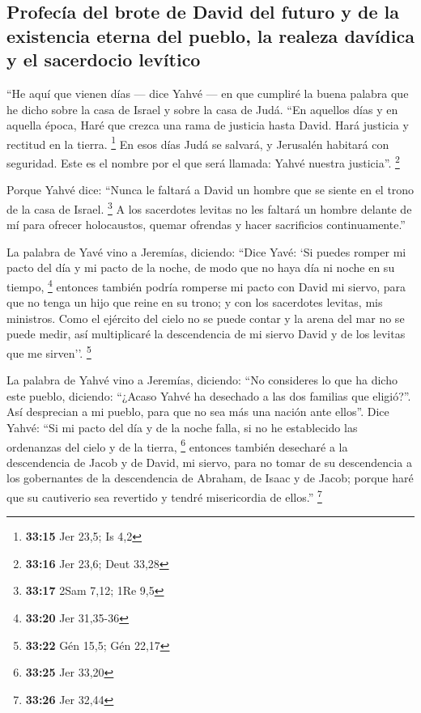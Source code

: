 \begin{paracol}{2}
\hypertarget{profecuxeda-del-brote-de-david-del-futuro-y-de-la-existencia-eterna-del-pueblo-la-realeza-davuxeddica-y-el-sacerdocio-levuxedtico}{%
\subsection{Profecía del brote de David del futuro y de la existencia
eterna del pueblo, la realeza davídica y el sacerdocio
levítico}\label{profecuxeda-del-brote-de-david-del-futuro-y-de-la-existencia-eterna-del-pueblo-la-realeza-davuxeddica-y-el-sacerdocio-levuxedtico}}

 ``He aquí que vienen días --- dice Yahvé --- en que
cumpliré la buena palabra que he dicho sobre la casa de Israel y sobre
la casa de Judá.  ``En aquellos días y en aquella época,
Haré que crezca una rama de justicia hasta David. Hará justicia y
rectitud en la tierra. \footnote{\textbf{33:15} Jer 23,5; Is 4,2}
 En esos días Judá se salvará, y Jerusalén habitará con
seguridad. Este es el nombre por el que será llamada: Yahvé nuestra
justicia''. \footnote{\textbf{33:16} Jer 23,6; Deut 33,28}

 Porque Yahvé dice: ``Nunca le faltará a David un hombre
que se siente en el trono de la casa de Israel. \footnote{\textbf{33:17}
  2Sam 7,12; 1Re 9,5}  A los sacerdotes levitas no les
faltará un hombre delante de mí para ofrecer holocaustos, quemar
ofrendas y hacer sacrificios continuamente.''

 La palabra de Yavé vino a Jeremías, diciendo:
 ``Dice Yavé: `Si puedes romper mi pacto del día y mi
pacto de la noche, de modo que no haya día ni noche en su tiempo,
\footnote{\textbf{33:20} Jer 31,35-36}  entonces también
podría romperse mi pacto con David mi siervo, para que no tenga un hijo
que reine en su trono; y con los sacerdotes levitas, mis ministros.
 Como el ejército del cielo no se puede contar y la arena
del mar no se puede medir, así multiplicaré la descendencia de mi siervo
David y de los levitas que me sirven''. \footnote{\textbf{33:22} Gén
  15,5; Gén 22,17}

 La palabra de Yahvé vino a Jeremías, diciendo:
 ``No consideres lo que ha dicho este pueblo, diciendo:
``¿Acaso Yahvé ha desechado a las dos familias que eligió?''. Así
desprecian a mi pueblo, para que no sea más una nación ante ellos''.
 Dice Yahvé: ``Si mi pacto del día y de la noche falla,
si no he establecido las ordenanzas del cielo y de la tierra,
\footnote{\textbf{33:25} Jer 33,20}  entonces también
desecharé a la descendencia de Jacob y de David, mi siervo, para no
tomar de su descendencia a los gobernantes de la descendencia de
Abraham, de Isaac y de Jacob; porque haré que su cautiverio sea
revertido y tendré misericordia de ellos.'' \footnote{\textbf{33:26} Jer
  32,44}


\end{paracol}
